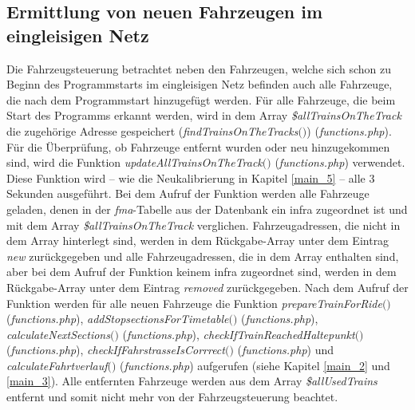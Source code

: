 \subsection{Ermittlung von neuen Fahrzeugen im eingleisigen Netz} \label{main_6}
Die Fahrzeugsteuerung betrachtet neben den Fahrzeugen, welche sich schon zu Beginn des Programmstarts im eingleisigen Netz befinden auch alle Fahrzeuge, die nach dem Programmstart hinzugefügt werden. Für alle Fahrzeuge, die beim Start des Programms erkannt werden, wird in dem Array \textit{\$allTrainsOnTheTrack} die zugehörige Adresse gespeichert (\textit{find\-Trains\-On\-The\-Tracks$($$)$}) (\textit{functions.php}). Für die Überprüfung, ob Fahrzeuge entfernt wurden oder neu hinzugekommen sind, wird die Funktion \textit{up\-date\-All\-Trains\-On\-The\-Track$($$)$} (\textit{functions.php}) verwendet. Diese Funktion wird -- wie die Neukalibrierung in Kapitel \ref{main_5} -- alle 3 Sekunden ausgeführt. Bei dem Aufruf der Funktion werden alle Fahrzeuge geladen, denen in der \textit{fma}-Tabelle aus der Datenbank ein \ac{infra} zugeordnet ist und mit dem Array \textit{\$allTrainsOnTheTrack} verglichen. Fahrzeugadressen, die nicht in dem Array hinterlegt sind, werden in dem Rückgabe-Array unter dem Eintrag \textit{new} zurückgegeben und alle Fahrzeugadressen, die in dem \mbox{Array} enthalten sind, aber bei dem Aufruf der Funktion keinem \ac{infra} zugeordnet sind, werden in dem Rückgabe-Array unter dem Eintrag \textit{removed} zurückgegeben. Nach dem Aufruf der Funktion werden für alle neuen Fahrzeuge die Funktion \textit{pre\-pare\-Train\-For\-Ride$($$)$} (\textit{func\-tions.php}), \textit{add\-Stop\-sec\-tions\-For\-Time\-table$($$)$} (\textit{func\-tions.php}), \textit{cal\-culate\-Next\-Sec\-tions$($$)$} (\textit{func\-tions.php}), \textit{check\-If\-Train\-Reached\-Halte\-punkt$($$)$} (\textit{func\-tions.php}), \textit{check\-If\-Fahr\-strasse\-Is\-Corrrect$($$)$} (\textit{func\-tions.php}) und \textit{calculate\-Fahrt\-ver\-lauf$($$)$} (\textit{func\-tions\-.php}) aufgerufen (siehe Kapitel \ref{main_2} und \ref{main_3}). Alle entfernten Fahrzeuge werden aus dem Array \textit{\$allUsedTrains} entfernt und somit nicht mehr von der Fahrzeugsteuerung beachtet. 
